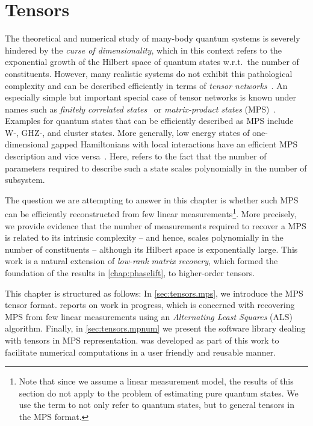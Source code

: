 \chapter{Tensors}
\label{chap:tensors}

The theoretical and numerical study of many-body quantum systems is severely hindered by the \emph{curse of dimensionality}, which in this context refers to the exponential growth of the Hilbert space of quantum states w.r.t.\ the number of constituents.
However, many realistic systems do not exhibit this pathological complexity and can be described efficiently in terms of \emph{tensor networks}~\cite{}.
An especially simple but important special case of tensor networks is known under names such as \emph{finitely correlated states}~\cite{Fannes_1992_Finitely} or \emph{matrix-product states} (MPS)~\cite{Garcia_2006_Matrix,Verstraete_2008_Matrix,Orus_2014_Practical}.
Examples for quantum states that can be efficiently described as MPS include W-, GHZ-, and cluster states.
More generally, low energy states of one-dimensional gapped Hamiltonians with local interactions have an efficient MPS description and vice versa~\cite{}.
Here,  refers to the fact that the number of parameters required to describe such a state scales polynomially in the number of subsystem.

The question we are attempting to answer in this chapter is whether such MPS can be efficiently reconstructed from few linear measurements\footnote{%
  Note that since we assume a linear measurement model, the results of this section do not apply to the problem of estimating pure quantum states.
  We use the term  to not only refer to quantum states, but to general tensors in the MPS format.
}.
More precisely, we provide evidence that the number of measurements required to recover a MPS is related to its intrinsic complexity -- and hence, scales polynomially in the number of constituents -- although its Hilbert space is exponentially large.
This work is a natural extension of \emph{low-rank matrix recovery}, which formed the foundation of the results in \cref{chap:phaselift}, to higher-order tensors.\\

This chapter is structured as follows:
In \cref{sec:tensors.mps}, we introduce the MPS tensor format.
 reports on work in progress, which is concerned with recovering MPS from few linear measurements using an \emph{Alternating Least Squares} (ALS) algorithm.
Finally, in \cref{sec:tensors.mpnum} we present the software library \mpnum dealing with tensors in MPS representation.
\mpnum was developed as part of this work to facilitate numerical computations in a user friendly and reusable manner.



